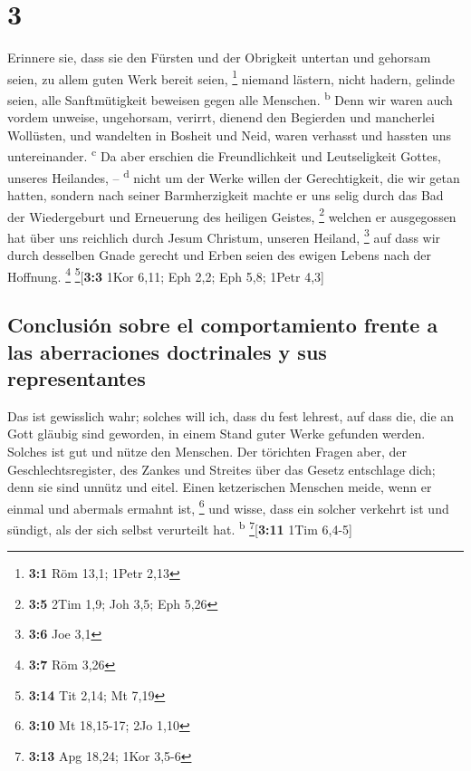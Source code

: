 \hypertarget{section-2}{%
\section{3}\label{section-2}}

 Erinnere sie, dass sie den Fürsten und der Obrigkeit
untertan und gehorsam seien, zu allem guten Werk bereit seien,
\footnote{\textbf{3:1} Röm 13,1; 1Petr 2,13}  niemand
lästern, nicht hadern, gelinde seien, alle Sanftmütigkeit beweisen gegen
alle Menschen. \textsuperscript{b}  Denn wir waren auch
vordem unweise, ungehorsam, verirrt, dienend den Begierden und
mancherlei Wollüsten, und wandelten in Bosheit und Neid, waren verhasst
und hassten uns untereinander. \textsuperscript{c}  Da
aber erschien die Freundlichkeit und Leutseligkeit Gottes, unseres
Heilandes, -- \textsuperscript{d}  nicht um der Werke
willen der Gerechtigkeit, die wir getan hatten, sondern nach seiner
Barmherzigkeit machte er uns selig durch das Bad der Wiedergeburt und
Erneuerung des heiligen Geistes, \footnote{\textbf{3:5} 2Tim 1,9; Joh
  3,5; Eph 5,26}  welchen er ausgegossen hat über uns
reichlich durch Jesum Christum, unseren Heiland, \footnote{\textbf{3:6}
  Joe 3,1}  auf dass wir durch desselben Gnade gerecht und
Erben seien des ewigen Lebens nach der Hoffnung. \footnote{\textbf{3:7}
  Röm 3,26} \footnote{\textbf{3:14} Tit 2,14; Mt 7,19}{[}\textbf{3:3}
1Kor 6,11; Eph 2,2; Eph 5,8; 1Petr 4,3{]}

\hypertarget{conclusiuxf3n-sobre-el-comportamiento-frente-a-las-aberraciones-doctrinales-y-sus-representantes}{%
\subsection{Conclusión sobre el comportamiento frente a las aberraciones
doctrinales y sus
representantes}\label{conclusiuxf3n-sobre-el-comportamiento-frente-a-las-aberraciones-doctrinales-y-sus-representantes}}

 Das ist gewisslich wahr; solches will ich, dass du fest
lehrest, auf dass die, die an Gott gläubig sind geworden, in einem Stand
guter Werke gefunden werden. Solches ist gut und nütze den Menschen.
 Der törichten Fragen aber, der Geschlechtsregister, des
Zankes und Streites über das Gesetz entschlage dich; denn sie sind
unnütz und eitel.  Einen ketzerischen Menschen meide,
wenn er einmal und abermals ermahnt ist, \footnote{\textbf{3:10} Mt
  18,15-17; 2Jo 1,10}  und wisse, dass ein solcher
verkehrt ist und sündigt, als der sich selbst verurteilt hat.
\textsuperscript{b} \footnote{\textbf{3:13} Apg 18,24; 1Kor 3,5-6}{[}\textbf{3:11}
1Tim 6,4-5{]}

